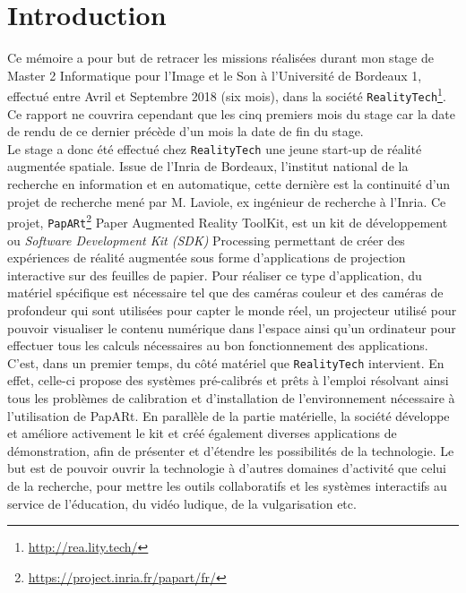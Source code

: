 \chapter{Introduction}
\label{chap:intro}

Ce mémoire a pour but de retracer les missions réalisées durant mon stage de Master 2 Informatique pour l'Image et le Son à l'Université de Bordeaux 1, effectué entre Avril et Septembre 2018 (six mois), dans la société \texttt{RealityTech}\footnote{\href{http://rea.lity.tech/}{http://rea.lity.tech/}}. Ce rapport ne couvrira cependant que les cinq premiers mois du stage car la date de rendu de ce dernier précède d'un mois la date de fin du stage.\\

Le stage a donc été effectué chez \texttt{RealityTech} une jeune start-up de réalité augmentée spatiale. Issue de l'Inria de Bordeaux, l'institut national de la recherche en information et en automatique, cette dernière est la continuité d'un projet de recherche mené par M. Laviole, ex ingénieur de recherche à l'Inria. Ce projet, \texttt{PapARt}\footnote{\href{https://project.inria.fr/papart/fr/}{https://project.inria.fr/papart/fr/}} Paper Augmented Reality ToolKit, est un kit de développement ou \emph{Software Development Kit (SDK)} Processing permettant de créer des expériences de réalité augmentée sous forme d'applications de projection interactive sur des feuilles de papier. Pour réaliser ce type d'application, du matériel spécifique est nécessaire tel que des caméras couleur et des caméras de profondeur qui sont utilisées pour capter le monde réel, un projecteur utilisé pour pouvoir visualiser le contenu numérique dans l'espace ainsi qu'un ordinateur pour effectuer tous les calculs nécessaires au bon fonctionnement des applications.\\

C'est, dans un premier temps, du côté matériel que \texttt{RealityTech} intervient. En effet, celle-ci propose des systèmes pré-calibrés et prêts à l'emploi résolvant ainsi tous les problèmes de calibration et d'installation de l'environnement nécessaire à l'utilisation de PapARt. En parallèle de la partie matérielle, la société développe et améliore activement le kit et créé également diverses applications de démonstration, afin de présenter et d'étendre les possibilités de la technologie. Le but est de pouvoir ouvrir la technologie à d'autres domaines d'activité que celui de la recherche, pour mettre les outils collaboratifs et les systèmes interactifs au service de l'éducation, du vidéo ludique, de la vulgarisation etc.

